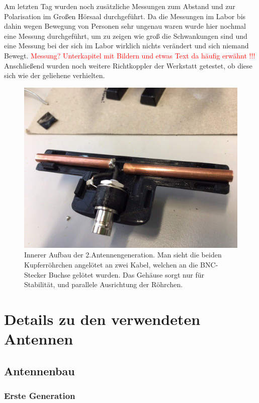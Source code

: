 \documentclass[titlepage,11pt,a4paper,ngerman]{article}
\begin{document}
Am letzten Tag wurden noch zusätzliche Messungen zum Abstand und zur Polarisation im Großen Hörsaal durchgeführt. Da die Messungen im Labor bis dahin wegen Bewegung von Personen sehr ungenau waren wurde hier nochmal eine Messung durchgeführt, um zu zeigen wie groß die Schwankungen sind und eine Messung bei der sich im Labor wirklich nichts verändert und sich niemand Bewegt. \textcolor{red}{Messung? Unterkapitel mit Bildern und etwas Text da häufig erwähnt !!!}
Anschließend wurden noch weitere Richtkoppler der Werkstatt getestet, ob diese sich wie der geliehene verhielten.
\begin{figure}[ht]
	\centering
	\includegraphics[scale=0.4, trim={0cm 0cm 0cm 8cm}, clip]{Bilder/Ant_innen_2}
	\caption{Innerer Aufbau der 2.Antennengeneration. Man sieht die beiden Kupferröhrchen angelötet an zwei Kabel, welchen an die BNC-Stecker Buchse gelötet wurden. Das Gehäuse sorgt nur für Stabilität, und parallele Ausrichtung der Röhrchen.}
	\label{Antenne2}
\end{figure}

\section{Details zu den verwendeten Antennen}

\subsection{Antennenbau}

\subsubsection{Erste Generation}
\end{document}
